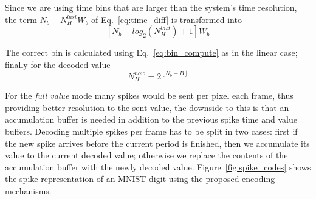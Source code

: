 \documentclass[twocolumn, a4paper]{article}
\begin{document}
Since we are using time bins that are larger than the system's time resolution, the term $N_{b} - N_{H}^{last}W_{b}$ of Eq.~\ref{eq:time_diff} is transformed into
\begin{equation}
\left[N_{b} - log_{2}(N_{H}^{last})  + 1\right]W_{b}
\end{equation}

The correct bin is calculated using Eq.~\ref{eq:bin_compute} as in the linear case; finally for the decoded value
\begin{equation}
N_{H}^{now} = 2^{ \left\lfloor N_{b} - B \right\rfloor }
\label{eq:new_Nh_exp}
\end{equation}

For the \textit{full value} mode many spikes would be sent per pixel each frame, thus providing better resolution to the sent value, the downside to this is that an accumulation buffer is needed in addition to the previous spike time and value buffers. Decoding multiple spikes per frame has to be split in two cases: first if the new spike arrives before the current period is finished, then we accumulate its value to the current decoded value; otherwise we replace the contents of the accumulation buffer with the newly decoded value. Figure~\ref{fig:spike_codes} shows the spike representation of an MNIST digit using the proposed encoding mechanisms.
\end{document}
